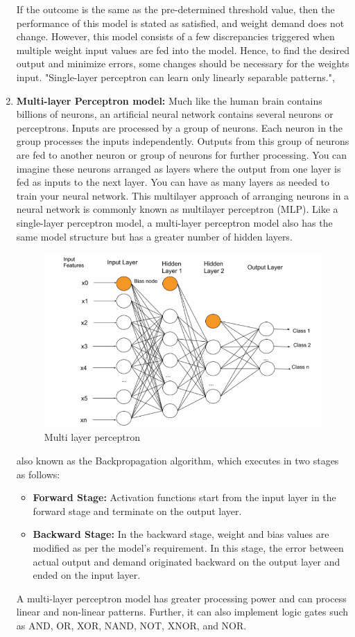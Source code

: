 \begin{enumerate}
    If the outcome is the same as the pre-determined threshold value, then the performance of this model is stated as satisfied, and weight demand does not change. However, this model consists of a few discrepancies triggered when multiple weight input values are fed into the model. Hence, to find the desired output and minimize errors, some changes should be necessary for the weights input.
    "Single-layer perceptron can learn only linearly separable patterns."\cite{ansari2020building}, \cite{knerr1990single}
    \item \textbf{Multi-layer Perceptron model: } Much like the human brain contains billions of neurons, an artificial neural network contains several neurons or perceptrons. Inputs are processed by a group of neurons. Each neuron in the group processes the inputs independently. Outputs from this group of neurons are fed to another neuron or group of neurons for further processing. You can imagine these neurons arranged as layers where the output from one layer is fed as inputs to the next layer. You can have as many layers as needed to train your neural network. This multilayer approach of arranging neurons in a neural network is commonly known as multilayer perceptron (MLP). Like a single-layer perceptron model, a multi-layer perceptron model also has the same model structure but has a greater number of hidden layers.
    \begin{figure}[H]
        \centering
        \includegraphics[width=0.8\linewidth]{tex/img/MLP.PNG}
        \caption{Multi layer perceptron}
        \label{fig:MLP}
    \end{figure}
    also known as the Backpropagation algorithm, which executes in two stages as follows:
    \begin{itemize}
        \item \textbf{Forward Stage:} Activation functions start from the input layer in the forward stage and terminate on the output layer.
        \item \textbf{Backward Stage:} In the backward stage, weight and bias values are modified as per the model's requirement. In this stage, the error between actual output and demand originated backward on the output layer and ended on the input layer.
    \end{itemize}
    A multi-layer perceptron model has greater processing power and can process linear and non-linear patterns. Further, it can also implement logic gates such as AND, OR, XOR, NAND, NOT, XNOR, and NOR.
    

\end{enumerate}
